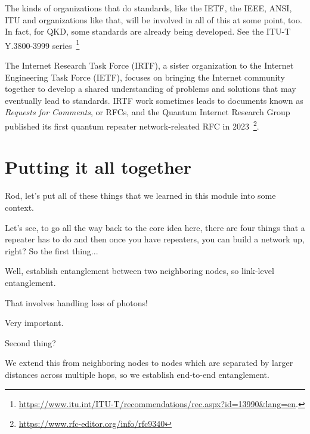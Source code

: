 The kinds of organizations that do standards, like the IETF, the IEEE, ANSI, ITU and organizations like that, will be involved in all of this at some point, too.  In fact, for QKD, some standards are already being developed.  See the ITU-T Y.3800-3999 series~\footnote{\url{https://www.itu.int/ITU-T/recommendations/rec.aspx?id=13990&lang=en}.}

The Internet Research Task Force (IRTF), a sister organization to the Internet Engineering Task Force (IETF), focuses on bringing the Internet community together to develop a shared understanding of problems and solutions that may eventually lead to standards. IRTF work sometimes leads to documents known as \emph{Requests for Comments}, or RFCs, and the Quantum Internet Research Group published its first quantum repeater network-releated RFC in 2023~\footnote{\url{https://www.rfc-editor.org/info/rfc9340}}.

\section{Putting it all together}


\mmm Rod, let's put all of these things that we learned in this module into some context.



\rrr Let's see, to go all the way back to the core idea here, there are four things that a repeater has to do and then once you have repeaters, you can build a network up, right? So the first thing...

\mmm Well, establish entanglement between two neighboring nodes, so link-level entanglement.

\rrr That involves handling loss of photons!

\mmm Very important.

\rrr Second thing?

\mmm We extend this from neighboring nodes to nodes which are separated by larger distances across multiple hops, so we establish end-to-end entanglement.

